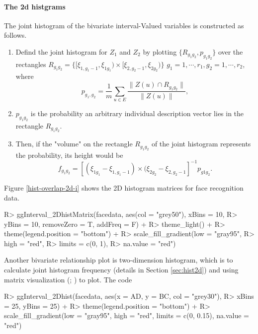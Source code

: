 \documentclass[article]{jss}
\begin{document}
\paragraph{The 2d histgrams}
The joint histogram of the bivariate interval-Valued variables is constructed 
as follows.
\begin{enumerate}
\item
Defind the joint histogram for $Z_1$ and $Z_2$ by plotting $\{R_{g_1 g_2}, 
p_{g_1 g_2}\}$ over the rectangles $R_{g_1 g_2} = \{[\xi_{1, g_1 -1}, 
\xi_{1g_1})\times [\xi_{2, g_2-1}, \xi_{2g_2})\}$
$g_1 =1, \cdots, r_1, g_2 = 1, \cdots, r_2$, where
\[ 
p_{g_1, g_2} =
\frac{1}{m}\sum_{u \in E}\frac{\|Z(u)\cap R_{g_1 g_2}\|}{\|Z(u)\|},
\]
\item
$p_{g_1 g_2}$ is the probability an arbitrary individual description vector 
lies in the rectangle $R_{g_1 g_2}$. 
\item
Then, if the "volume" on
the rectangle $R_{g_1 g_2}$ of the joint histogram represents the probability, 
its height would be
\[
f_{g_1 g_2} = [(\xi_{1g_1}-\xi_{1,g_1 -1})\times (\xi_{2g_2}- \xi_{2,g_2 
-1}]^{-1}
p_{g1 g_2}.
\]
\end{enumerate}
Figure \ref{hist-overlap-2d-i} shows the 2D histogram matrices for face 
recognition data.
\begin{CodeChunk}
\begin{CodeInput}
R> ggInterval_2DhistMatrix(facedata, aes(col = "grey50"), xBins = 10,
R>                         yBins = 10, removeZero = T, addFreq = F) +
R>   theme_light() + 
R>   theme(legend.position = "bottom") + 
R>   scale_fill_gradient(low = "gray95",
R>                       high = "red",
R>                       limits = c(0, 1),
R>                       na.value = "red") 
\end{CodeInput}
\end{CodeChunk}


Another bivariate relationship plot is two-dimension histogram, which is to calculate joint histogram frequency (details in Section \ref{sec:hist2d}) and using matrix visualization (\cite{chen2002generalized}; \cite{chen2004matrix}) to plot. The code

\begin{CodeChunk}
\begin{CodeInput}
R> ggInterval_2Dhist(facedata, aes(x = AD, y = BC, col = "grey30"),
R>                   xBins = 25, yBins = 25) +
R>   theme(legend.position = "bottom") +
R>   scale_fill_gradient(low = "gray95", high = "red", limits = c(0, 0.15),
                      na.value = "red")
\end{CodeInput}
\end{CodeChunk}
\end{document}
